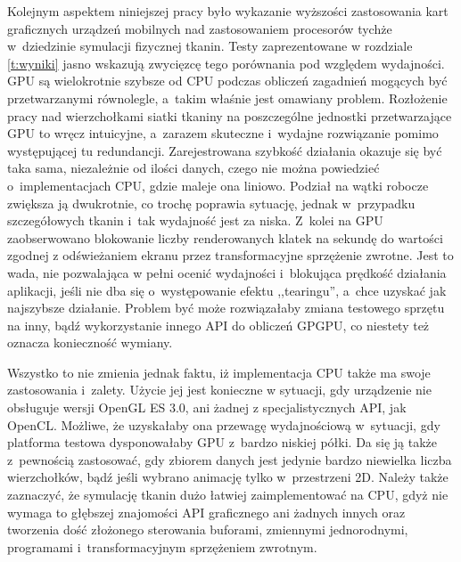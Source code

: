 	
	Kolejnym aspektem niniejszej pracy było wykazanie wyższości zastosowania kart graficznych urządzeń mobilnych nad zastosowaniem procesorów tychże w~dziedzinie symulacji fizycznej tkanin. Testy zaprezentowane w rozdziale \ref{t:wyniki} jasno wskazują zwycięzcę tego porównania pod względem wydajności. GPU są wielokrotnie szybsze od CPU podczas obliczeń zagadnień mogących być przetwarzanymi równolegle, a~takim właśnie jest omawiany problem. Rozłożenie pracy nad wierzchołkami siatki tkaniny na poszczególne jednostki przetwarzające GPU to wręcz intuicyjne, a~zarazem skuteczne i~wydajne rozwiązanie pomimo występującej tu redundancji. Zarejestrowana szybkość działania okazuje się być taka sama, niezależnie od ilości danych, czego nie można powiedzieć o~implementacjach CPU, gdzie maleje ona liniowo. Podział na wątki robocze zwiększa ją dwukrotnie, co trochę poprawia sytuację, jednak w~przypadku szczegółowych tkanin i~tak wydajność jest za niska. Z~kolei na GPU zaobserwowano blokowanie liczby renderowanych klatek na sekundę do wartości zgodnej z odświeżaniem ekranu przez transformacyjne sprzężenie zwrotne. Jest to wada, nie pozwalająca w pełni ocenić wydajności i~blokująca prędkość działania aplikacji, jeśli nie dba się o~występowanie efektu ,,tearingu'', a~chce uzyskać jak najszybsze działanie. Problem być może rozwiązałaby zmiana testowego sprzętu na inny, bądź wykorzystanie innego API do obliczeń GPGPU, co niestety też oznacza konieczność wymiany.
	
	Wszystko to nie zmienia jednak faktu, iż implementacja CPU także ma swoje zastosowania i~zalety. Użycie jej jest konieczne w sytuacji, gdy urządzenie nie obsługuje wersji OpenGL ES 3.0, ani żadnej z specjalistycznych API, jak OpenCL. Możliwe, że uzyskałaby ona przewagę wydajnościową w~sytuacji, gdy platforma testowa dysponowałaby GPU z~bardzo niskiej półki. Da się ją także z~pewnością zastosować, gdy zbiorem danych jest jedynie bardzo niewielka liczba wierzchołków, bądź jeśli wybrano animację tylko w~przestrzeni 2D. Należy także zaznaczyć, że symulację tkanin dużo łatwiej zaimplementować na CPU, gdyż nie wymaga to głębszej znajomości API graficznego ani żadnych innych oraz tworzenia dość złożonego sterowania buforami, zmiennymi jednorodnymi, programami i~transformacyjnym sprzężeniem zwrotnym.
	
